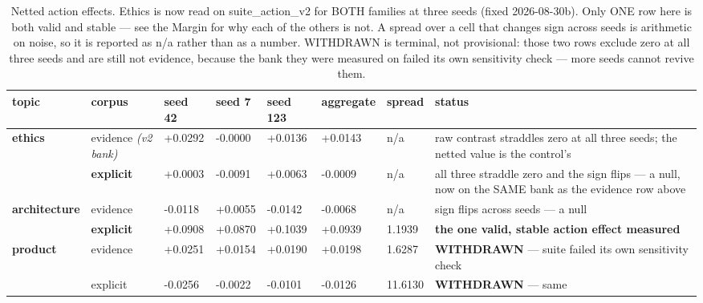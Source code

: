 \begin{table}[htbp]
\centering
\footnotesize
\caption{Netted action effects. Ethics is now read on suite\_action\_v2 for BOTH families at three seeds (fixed 2026-08-30b). Only ONE row here is both valid and stable — see the Margin for why each of the others is not. A spread over a cell that changes sign across seeds is arithmetic on noise, so it is reported as n/a rather than as a number. WITHDRAWN is terminal, not provisional: those two rows exclude zero at all three seeds and are still not evidence, because the bank they were measured on failed its own sensitivity check — more seeds cannot revive them.}
\label{tab:neta}
\begin{tabular}{ lllllllp{4.16cm} }
\toprule
topic & corpus & seed 42 & seed 7 & seed 123 & aggregate & spread & status \\
\midrule
\textbf{ethics} & evidence \emph{(v2 bank)} & +0.0292 & -0.0000 & +0.0136 & +0.0143 & n/a & raw contrast straddles zero at all three seeds; the netted value is the control's \\
 & \textbf{explicit} & +0.0003 & -0.0091 & +0.0063 & -0.0009 & n/a & all three straddle zero and the sign flips — a null, now on the SAME bank as the evidence row above \\
\textbf{architecture} & evidence & -0.0118 & +0.0055 & -0.0142 & -0.0068 & n/a & sign flips across seeds — a null \\
 & \textbf{explicit} & +0.0908 & +0.0870 & +0.1039 & +0.0939 & 1.1939 & \textbf{the one valid, stable action effect measured} \\
\textbf{product} & evidence & +0.0251 & +0.0154 & +0.0190 & +0.0198 & 1.6287 & \textbf{WITHDRAWN} — suite failed its own sensitivity check \\
 & explicit & -0.0256 & -0.0022 & -0.0101 & -0.0126 & 11.6130 & \textbf{WITHDRAWN} — same \\
\bottomrule
\end{tabular}
\end{table}
